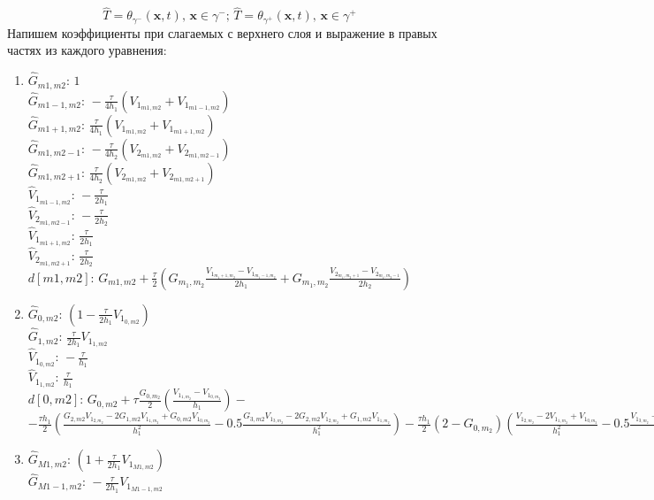 \documentclass[a4paper]{article}
\theoremstyle{definition}
\numberwithin{equation}{section}
\begin{document}
$$\hat{T}=\theta_{\gamma^-}(\textbf{x},t), \, \textbf{x}\in\gamma^-;\, \hat{T}=\theta_{\gamma^+}(\textbf{x},t), \, \textbf{x}\in\gamma^+$$
Напишем коэффициенты при слагаемых с верхнего слоя и выражение в правых частях из каждого уравнения:
\begin{enumerate}
\item
$\hat{G}_{m1,m2} : \, 1$ \\
$\hat{G}_{m1-1,m2} : \, -\frac{\tau}{4h_1}(V_{1_{m1,m2}} + V_{1_{m1-1,m2}})$\\
$\hat{G}_{m1+1,m2} : \, \frac{\tau}{4h_1}(V_{1_{m1,m2}} + V_{1_{m1+1,m2}})$\\
$\hat{G}_{m1,m2-1} : \, -\frac{\tau}{4h_2}(V_{2_{m1,m2}} + V_{2_{m1,m2-1}})$\\
$\hat{G}_{m1,m2+1} : \, \frac{\tau}{4h_2}(V_{2_{m1,m2}} + V_{2_{m1,m2+1}})$\\
$\hat{V}_{1_{m1-1,m2}} : \, -\frac{\tau}{2h_1}$\\
$\hat{V}_{2_{m1,m2-1}} : \, -\frac{\tau}{2h_2}$\\
$\hat{V}_{1_{m1+1,m2}} : \, \frac{\tau}{2h_1}$\\
$\hat{V}_{2_{m1,m2+1}} : \, \frac{\tau}{2h_2}$\\
$d[m1,m2] : \, G_{m1,m2}+ \frac{\tau}{2}\left( G_{m_1,m_2}\frac{V_{1_{m_1+1,m_2}} - V_{1_{m_1-1,m_2}}}{2h_1} + G_{m_1,m_2}\frac{V_{2_{m_1,m_2+1}} - V_{2_{m_1,m_2-1}}}{2h_2} \right)$
\item 
$\hat{G}_{0,m2} : \, (1-\frac{\tau}{2h_1}V_{1_{0,m2}})$ \\
$\hat{G}_{1,m2} : \, \frac{\tau}{2h_1}V_{1_{1,m2}}$ \\
$\hat{V}_{1_{0,m2}} : \, -\frac{\tau}{h_1}$\\
$\hat{V}_{1_{1,m2}} : \, \frac{\tau}{h_1}$\\
$d[0,m2] : \, G_{0,m2}+\tau\frac{G_{0,m_2}}{2}\left( \frac{V_{1_{1,m_2}} - V_{1_{0,m_2}}}{h_1}\right) -$\\$- \frac{\tau h_1}{2}\left( \frac{G_{2,m2}V_{1_{2,m_2}} - 2G_{1,m2}V_{1_{1,m_2}} + G_{0,m2}V_{1_{0,m_2}}}{h_1^2} - 0.5\frac{G_{3,m2}V_{1_{3,m_2}} - 2G_{2,m2}V_{1_{2,m_2}} + G_{1,m2}V_{1_{1,m_2}}}{h_1^2} \right) - \frac{\tau h_1}{2}(2-G_{0,m_2})\left( \frac{V_{1_{2,m_2}} - 2V_{1_{1,m_2}} + V_{1_{0,m_2}}}{h_1^2} - 0.5\frac{V_{1_{3,m_2}} - 2V_{1_{2,m_2}} + V_{1_{1,m_2}}}{h_1^2} \right) $
\item
$\hat{G}_{M1,m2} : \, (1+\frac{\tau}{2h_1}V_{1_{M1,m2}})$ \\
$\hat{G}_{M1-1,m2} : \, -\frac{\tau}{2h_1}V_{1_{M1-1,m2}}$ \\

\end{enumerate}
\end{document}
